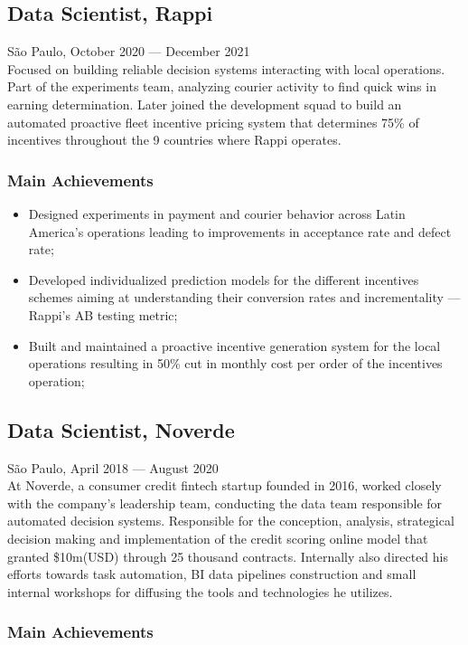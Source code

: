 \documentclass{article}
\newcommand{\jobdate}[3]{
\large
\vspace{0.05em} 
  {#1, #2 --- #3}
\vspace{0.5em} 
\\
}
\begin{document}
\pagebreak

\subsection{Data Scientist, Rappi}
\jobdate{São Paulo}{October 2020}{December 2021}
Focused on building reliable decision systems interacting with local operations. Part of the experiments team, analyzing courier activity to find quick wins in earning determination. Later joined the development squad to build an automated proactive fleet incentive pricing system that determines 75\% of incentives throughout the 9 countries where Rappi operates.
\subsubsection{Main Achievements}

\begin{itemize}
\item{Designed experiments in payment and courier behavior across Latin America's operations leading to improvements in acceptance rate and defect rate;}
\item{Developed individualized prediction models for the different incentives schemes aiming at understanding their conversion rates and incrementality --- Rappi's AB testing metric;}
\item{Built and maintained a proactive incentive generation system for the local operations resulting in 50\% cut in monthly cost per order of the incentives operation;}
\end{itemize}

\subsection{Data Scientist, Noverde}
\jobdate{São Paulo}{April 2018}{August 2020}
At Noverde, a consumer credit fintech startup founded in 2016, worked closely with the company's leadership team, conducting the data team responsible for automated decision systems. Responsible for the conception, analysis, strategical decision making and implementation of the credit scoring online model that granted \$10m(USD) through 25 thousand contracts. Internally also directed his efforts towards task automation, BI data pipelines construction and small internal workshops for diffusing the tools and technologies he utilizes.
\subsubsection{Main Achievements}
\end{document}
